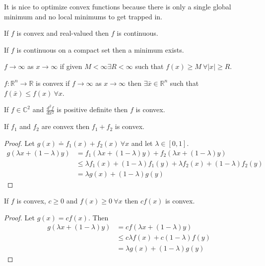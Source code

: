 \documentclass[lecture,12pt,]{pcms-l}
\begin{document}
It is nice to optimize convex functions because there is only a single global minimum and no local minimums to get trapped in.

\begin{theorem}
If $f$ is convex and real-valued then $f$ is continuous.
\end{theorem}

\begin{theorem}
If $f$ is continuous on a compact set then a minimum exists.
\end{theorem}

\begin{definition}
$f\to\infty$ as $x\to\infty$ if given $M<\infty \exists R<\infty$ such that $f(x)\geq M ~\forall |x|\geq R$.
\end{definition}

\begin{theorem}
$f:\mathbb{R}^n\to\mathbb{R}$ is convex if $f\to\infty$ as $x\to\infty$ then $\exists \bar{x}\in\mathbb{R}^n$ such that $f(\bar{x})\leq f(x) ~\forall x$.
\end{theorem}

\begin{theorem}
If $f\in\mathbb{C}^2$ and $\frac{d^2f}{dx^2}$ is positive definite then $f$ is convex.
\end{theorem}

\begin{theorem}
\label{th:sumConvex}
If $f_1$ and $f_2$ are convex then $f_1+f_2$ is convex.
\end{theorem}

\begin{proof}
Let $g(x) \doteq f_1(x) + f_2(x) ~\forall x$ and let $\lambda\in[0,1]$.
\begin{align*}
g(\lambda x + (1-\lambda)y) &= f_1(\lambda x+(1-\lambda)y) + f_2(\lambda x+(1-\lambda)y) \\
&\leq \lambda f_1(x) + (1-\lambda)f_1(y) + \lambda f_2(x) + (1-\lambda)f_2(y) \\
&= \lambda g(x) + (1-\lambda)g(y)
\end{align*}
\end{proof}

\begin{theorem}
\label{th:cfxconvex}
If $f$ is convex, $c\geq 0$ and $f(x)\geq 0 ~\forall x$ then $cf(x)$ is convex.
\end{theorem}

\begin{proof}
Let $g(x)=cf(x)$. Then
\begin{align*}
g(\lambda x+(1-\lambda)y) &= cf(\lambda x+(1-\lambda)y) \\
&\leq c\lambda f(x) + c(1-\lambda)f(y) \\
&= \lambda g(x) + (1-\lambda)g(y)
\end{align*}
\end{proof}
\end{document}
